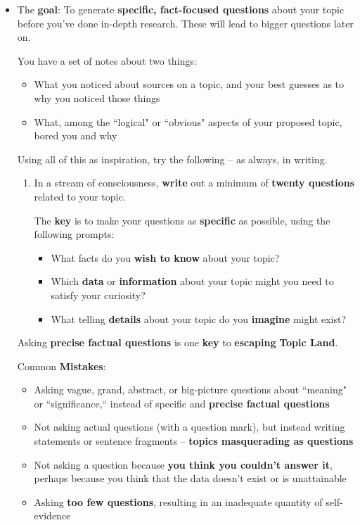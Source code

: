 \documentclass[11pt]{article}
\begin{document}
\begin{itemize}
\vspace{20pt}
\item \begin{exercise}

The \textbf{goal}: To generate \textbf{specific, fact-focused questions} about your topic before you’ve done in-depth research. These will lead to bigger questions later on.

You have a set of notes about two things:
\begin{itemize}
\item What you noticed about sources on a topic, and your best guesses as to why you noticed those things

\item What, among the ``logical" or ``obvious" aspects of your proposed topic, bored you and why
\end{itemize} Using all of this as inspiration, try the following -- as always, in writing.
\begin{enumerate}
\item In a stream of consciousness, \textbf{write} out a minimum of \textbf{twenty questions} related to your topic. 

The \textbf{key} is to make your questions as \textbf{specific} as possible, using the following prompts:
\begin{itemize}
\item What facts do you \textbf{wish to know} about your topic?
\item Which \textbf{data} or \textbf{information} about your topic might you need to satisfy your curiosity?
\item What telling \textbf{details} about your topic do you \textbf{imagine} might exist?
\end{itemize}
\end{enumerate}
Asking \textbf{precise factual questions} is one \textbf{key} to \textbf{escaping} \textbf{Topic Land}.
\end{exercise}
Common \textbf{Mistakes}:
\begin{itemize}
\item Asking vague, grand, abstract, or big-picture questions about ``meaning" or ``significance,“ instead of specific and \textbf{precise factual questions}
\item Not asking actual questions (with a question mark), but instead writing statements or sentence fragments -- \textbf{topics masquerading as questions}
\item Not asking a question because \textbf{you think you couldn’t answer it}, perhaps because you think that the data doesn’t exist or is unattainable
\item Asking \textbf{too few questions}, resulting in an inadequate quantity of self-evidence
\end{itemize}
\end{itemize}
\end{document}
